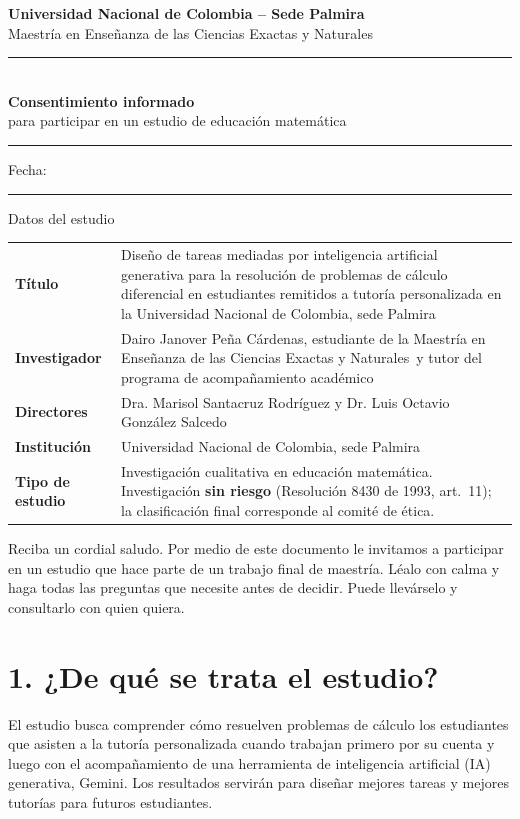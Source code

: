 \documentclass[11pt,letterpaper]{article}
\newcommand{\Titulo}{Diseño de tareas mediadas por inteligencia artificial generativa para la resolución de problemas de cálculo diferencial en estudiantes remitidos a tutoría personalizada en la Universidad Nacional de Colombia, sede Palmira}
\newcommand{\Investigador}{Dairo Janover Peña Cárdenas}
\newcommand{\Directores}{Dra. Marisol Santacruz Rodríguez y Dr. Luis Octavio González Salcedo}
\newcommand{\Programa}{Maestría en Enseñanza de las Ciencias Exactas y Naturales}
\newcommand{\linea}[1][6cm]{\rule{#1}{0.4pt}}
\begin{document}
\begin{center}
{\large\bfseries Universidad Nacional de Colombia -- Sede Palmira}\\[2pt]
{\Programa}\\[10pt]
{\color{unalverde}\rule{\linewidth}{1pt}}\\[4pt]
{\LARGE\bfseries Consentimiento informado}\\[4pt]
{\large para participar en un estudio de educación matemática}\\[4pt]
{\color{unalverde}\rule{\linewidth}{1pt}}
\end{center}

\noindent Fecha: \linea[4cm]

\begin{caja}{Datos del estudio}
\small
\begin{tabularx}{\linewidth}{@{}>{\bfseries}p{3.8cm}L@{}}
Título & \Titulo\\
Investigador & \Investigador, estudiante de la \Programa\ y tutor del programa de acompañamiento académico\\
Directores & \Directores\\
Institución & Universidad Nacional de Colombia, sede Palmira\\
Tipo de estudio & Investigación cualitativa en educación matemática. Investigación \textbf{sin riesgo} (Resolución 8430 de 1993, art.~11); la clasificación final corresponde al comité de ética.\\
\end{tabularx}
\end{caja}

\noindent Reciba un cordial saludo. Por medio de este documento le invitamos a participar en un estudio que hace parte de un trabajo final de maestría. Léalo con calma y haga todas las preguntas que necesite antes de decidir. Puede llevárselo y consultarlo con quien quiera.

\section*{1. ¿De qué se trata el estudio?}
El estudio busca comprender cómo resuelven problemas de cálculo los estudiantes que asisten a la tutoría personalizada cuando trabajan primero por su cuenta y luego con el acompañamiento de una herramienta de inteligencia artificial (IA) generativa, Gemini. Los resultados servirán para diseñar mejores tareas y mejores tutorías para futuros estudiantes.
\end{document}
